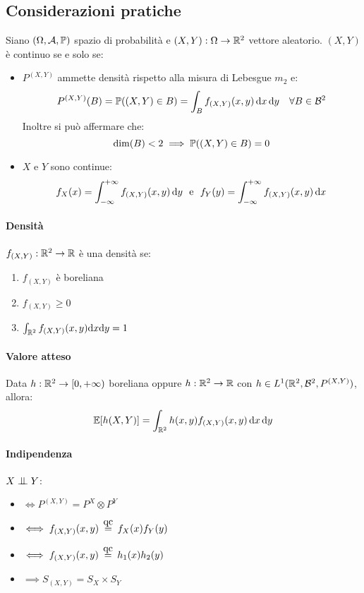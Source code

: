 \subsection{Considerazioni pratiche}
Siano $(\Omega, \mathcal A, \mathbb P)$ spazio di probabilità e $(X,Y) : \Omega \to \mathbb R^2$ vettore aleatorio. $(X,Y)$ è continuo se e solo se:
\begin{itemize}
  \item $P^{(X,Y)}$ ammette densità rispetto alla misura di Lebesgue $m_2$ e:
  $$P^{(X,Y)}(B) = \mathbb P((X,Y) \in B) = \int_B f_{(X,Y)}(x,y) \,
  \mathrm d x \, \mathrm d y \quad \forall B \in \mathcal B^2 $$
  Inoltre si può affermare che:
  $$\dim (B) < 2 \implies \mathbb P( (X,Y) \in B) =0 $$
  \item $X$ e $Y$ sono continue:
  $$f_X(x)= \int_{-\infty}^{+\infty} f_{(X,Y)}(x,y) \, \mathrm d y \ \text{ e } \ f_Y(y)= \int_{-\infty}^{+\infty} f_{(X,Y)}(x,y) \, \mathrm d x$$
\end{itemize}

\paragraph{Densità}
$f_{(X,Y)}: \mathbb R^2 \to \mathbb R$ è una densità se:
\begin{enumerate}
  \item $f_{(X,Y)}$ è boreliana
  \item $f_{(X,Y)} \ge 0$
  \item $\int_{\mathbb R^2} f_{(X,Y)}(x,y) \mathrm d x \mathrm d y =1$
\end{enumerate}

\paragraph{Valore atteso}
Data $h: \mathbb R^2 \to [0, +\infty)$ boreliana oppure $ h: \mathbb R^2 \to \mathbb R$ con $h \in L^1(\mathbb R^2, \mathcal B^2, P^{(X,Y)})$, allora:
$$\mathbb E[h(X,Y)] = \int_{\mathbb R^2} h(x,y) f_{(X,Y)}(x,y) \, \mathrm d x \, \mathrm d y$$

\paragraph{Indipendenza}
$X \indep Y$:
\begin{itemize}
  \item[] $\iff P^{(X,Y)} = P^X \otimes P^Y$
  \item[] $\iff f_{(X,Y)}(x,y) \aceq f_X(x)f_Y(y)$
  \item[] $\iff f_{(X,Y)}(x,y) \aceq h_1(x)h_2(y)$
  \item[] $\implies S_{(X,Y)}=S_X \times S_Y$
\end{itemize}
\medskip

